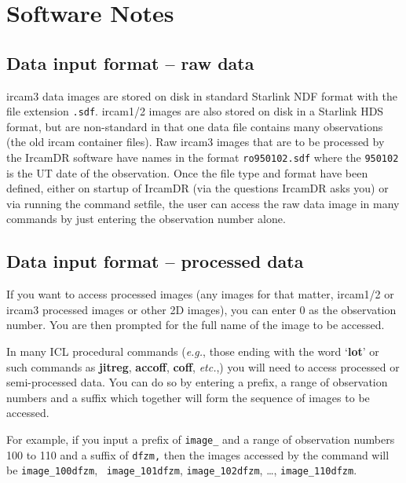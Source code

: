 \section{\label{se:soft_notes}Software Notes}

\subsection{\label{ss:data_input_format_raw}Data input format -- raw data}

{\sc ircam3} data images are stored on disk in standard Starlink NDF
format with the file extension {\tt .sdf}.  {\sc ircam1/2} images are
also stored on disk in a Starlink HDS format, but are non-standard in
that one data file contains many observations (the old {\sc ircam}
container files). Raw {\sc ircam3} images that are to be processed by
the {\sc IrcamDR} software have names in the format {\tt ro950102.sdf}
where the {\tt 950102} is the UT date of the observation.  Once the
file type and format have been defined, either on startup of {\sc
IrcamDR} (via the questions {\sc IrcamDR} asks you) or via running the
command setfile, the user can access the raw data image in many
commands by just entering the observation number alone.

\subsection{\label{ss:data_input_format_processed}Data input format -- processed data}

If you want to access processed images (any images for that
matter, {\sc ircam1/2} or {\sc ircam3} processed images or other 2D
images), you can enter 0 as the observation number.  You are then
prompted for the full name of the image to be accessed.

In many ICL procedural commands (\emph{e.g.}, those ending with the word
`{\bf lot}' or such commands as {\bf jitreg}, {\bf accoff}, {\bf coff},
\emph{etc.},) you will need to access processed or semi-processed data.
You can do so by entering a prefix, a range of observation numbers
and a suffix which together will form the sequence of images to be
accessed.

For example, if you input a prefix of {\tt image\_} and a range of
observation numbers 100 to 110 and a suffix of {\tt dfzm,} then the
images accessed by the command will be {\tt image\_100dfzm}, {\tt
image\_101dfzm}, {\tt image\_102dfzm}, \ldots, {\tt image\_110dfzm}.

